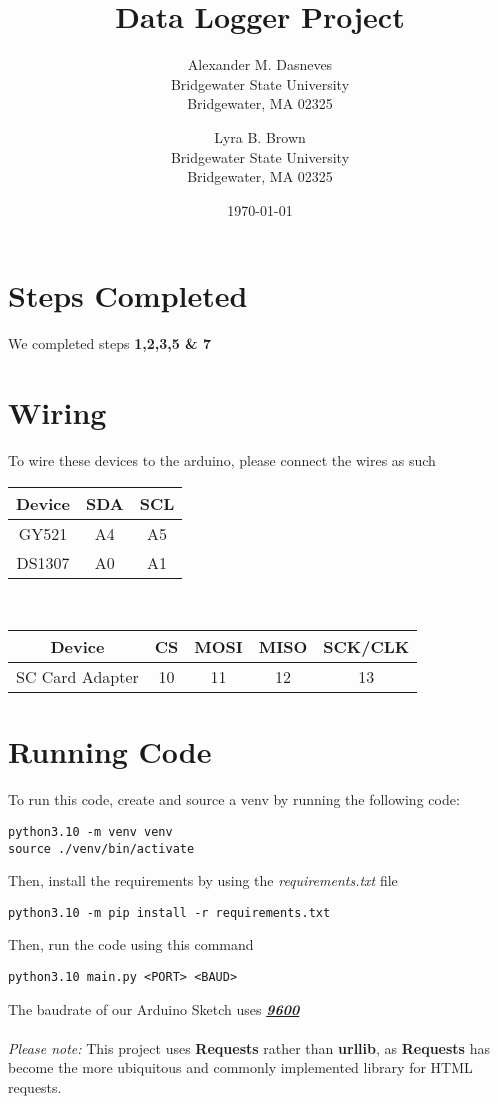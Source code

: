 \documentclass{article}
\title{Data Logger Project}
\author{Alexander M. Dasneves\\Bridgewater State University\\Bridgewater, MA 02325\and Lyra B. Brown\\Bridgewater State University\\Bridgewater, MA 02325}
\date{\today}
\begin{document}
  \maketitle

  \section*{Steps Completed}
  \noindent
  We completed steps \textbf{1,2,3,5 \& 7}
  
  \section*{Wiring}
  \noindent
  To wire these devices to the arduino, please connect the wires as such\\
  \begin{tabular}{|c|c|c|}
    \hline
    Device&SDA&SCL\\
    \hline
    GY521&A4&A5\\
    DS1307&A0&A1\\
    \hline
  \end{tabular}
  \vspace{0.1in}
  \\
  \noindent
  \begin{tabular}{|c|c|c|c|c|}
    \hline
    Device&CS&MOSI&MISO&SCK/CLK\\
    \hline
    SC Card Adapter & 10 & 11 & 12 & 13\\
    \hline
  \end{tabular}
  
  \section*{Running Code}
  \noindent
  To run this code, create and source a venv by running the following code:\\
  \begin{verbatim}
python3.10 -m venv venv
source ./venv/bin/activate
  \end{verbatim}
  Then, install the requirements by using the \textit{requirements.txt} file\\
  \begin{verbatim}
python3.10 -m pip install -r requirements.txt
  \end{verbatim}
  Then, run the code using this command\\
  \begin{verbatim}
python3.10 main.py <PORT> <BAUD>
  \end{verbatim}
  The baudrate of our Arduino Sketch uses \textbf{\textit{\underline{9600}}}\\
  \\
  \textit{Please note:} This project uses \textbf{Requests} rather than \textbf{urllib}, as \textbf{Requests} has become the more ubiquitous and commonly implemented library for HTML requests.
\end{document}
